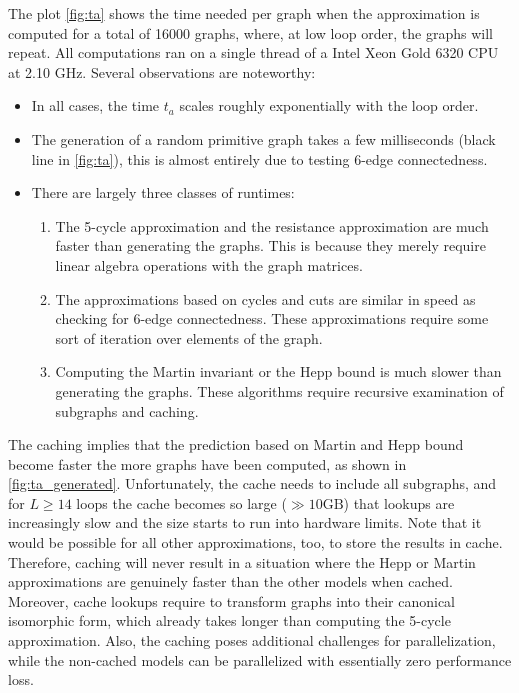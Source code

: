\documentclass[12pt]{article}
\numberwithin{equation}{section}
\begin{document}
The plot \cref{fig:ta} shows the time needed per graph when the approximation is computed for a total of 16000 graphs, where, at low loop order, the graphs will repeat. All computations ran on a single thread of a Intel Xeon Gold 6320 CPU at 2.10 GHz. Several observations are noteworthy:
\begin{itemize}
	\item In all cases, the time $t_a$  scales roughly exponentially with the loop order.
	\item The generation of a random primitive graph takes a few milliseconds (black line in \cref{fig:ta}), this is almost entirely due to testing 6-edge connectedness.
	\item There are largely three classes of runtimes:
	\begin{enumerate}
		\item The 5-cycle approximation and the resistance approximation are much faster than generating the graphs. This is because they merely require linear algebra operations with the graph matrices.
		\item The approximations based on cycles and cuts are similar in speed as checking for 6-edge connectedness. These approximations require some sort of iteration over elements of the graph.
		\item Computing the Martin invariant or the Hepp bound is much slower than generating the graphs. These algorithms require recursive examination of subgraphs and  caching.
	\end{enumerate}
\end{itemize}

The caching implies that the prediction based on Martin and Hepp bound become faster  the more graphs have been computed, as shown in \cref{fig:ta_generated}. Unfortunately, the cache needs to include all subgraphs, and  for $L \geq 14$ loops the cache becomes so large ($\gg 10\text{GB}$) that lookups are increasingly slow and the size starts to run into hardware limits. Note that it would be possible  for all other approximations, too, to store the results in cache. Therefore, caching will never result in a situation where the Hepp or Martin approximations are genuinely faster than the other models when cached. Moreover, cache lookups require to transform graphs into their canonical isomorphic form, which already takes longer than computing the 5-cycle approximation. Also, the caching poses additional challenges for parallelization, while the non-cached models can be parallelized with essentially zero performance loss. 
\end{document}
